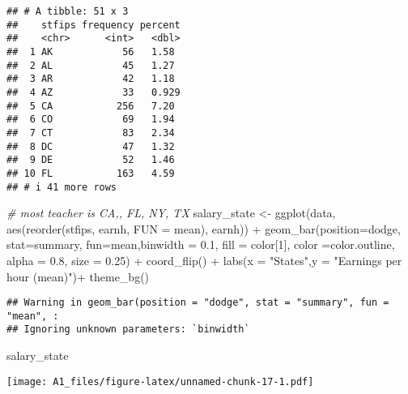 \documentclass[
]{article}
\newenvironment{Shaded}{\begin{snugshade}}{\end{snugshade}}
\newcommand{\AttributeTok}[1]{\textcolor[rgb]{0.77,0.63,0.00}{#1}}
\newcommand{\CommentTok}[1]{\textcolor[rgb]{0.56,0.35,0.01}{\textit{#1}}}
\newcommand{\DecValTok}[1]{\textcolor[rgb]{0.00,0.00,0.81}{#1}}
\newcommand{\FloatTok}[1]{\textcolor[rgb]{0.00,0.00,0.81}{#1}}
\newcommand{\FunctionTok}[1]{\textcolor[rgb]{0.00,0.00,0.00}{#1}}
\newcommand{\NormalTok}[1]{#1}
\newcommand{\OtherTok}[1]{\textcolor[rgb]{0.56,0.35,0.01}{#1}}
\newcommand{\SpecialCharTok}[1]{\textcolor[rgb]{0.00,0.00,0.00}{#1}}
\newcommand{\StringTok}[1]{\textcolor[rgb]{0.31,0.60,0.02}{#1}}
\begin{document}
\begin{verbatim}
## # A tibble: 51 x 3
##    stfips frequency percent
##    <chr>      <int>   <dbl>
##  1 AK            56   1.58 
##  2 AL            45   1.27 
##  3 AR            42   1.18 
##  4 AZ            33   0.929
##  5 CA           256   7.20 
##  6 CO            69   1.94 
##  7 CT            83   2.34 
##  8 DC            47   1.32 
##  9 DE            52   1.46 
## 10 FL           163   4.59 
## # i 41 more rows
\end{verbatim}

\begin{Shaded}
\begin{Highlighting}[]
\CommentTok{\# most teacher is CA,, FL, NY, TX}
\NormalTok{salary\_state }\OtherTok{\textless{}{-}} \FunctionTok{ggplot}\NormalTok{(data, }\FunctionTok{aes}\NormalTok{(}\FunctionTok{reorder}\NormalTok{(stfips, earnh, }\AttributeTok{FUN =}\NormalTok{ mean), earnh)) }\SpecialCharTok{+}
  \FunctionTok{geom\_bar}\NormalTok{(}\AttributeTok{position=}\StringTok{\textquotesingle{}dodge\textquotesingle{}}\NormalTok{, }\AttributeTok{stat=}\StringTok{\textquotesingle{}summary\textquotesingle{}}\NormalTok{, }\AttributeTok{fun=}\StringTok{\textquotesingle{}mean\textquotesingle{}}\NormalTok{,}\AttributeTok{binwidth =} \FloatTok{0.1}\NormalTok{, }\AttributeTok{fill =}\NormalTok{ color[}\DecValTok{1}\NormalTok{], }\AttributeTok{color =}\NormalTok{color.outline, }\AttributeTok{alpha =} \FloatTok{0.8}\NormalTok{, }\AttributeTok{size =} \FloatTok{0.25}\NormalTok{) }\SpecialCharTok{+}
   \FunctionTok{coord\_flip}\NormalTok{() }\SpecialCharTok{+}
  \FunctionTok{labs}\NormalTok{(}\AttributeTok{x =} \StringTok{"States"}\NormalTok{,}\AttributeTok{y =} \StringTok{"Earnings per hour (mean)"}\NormalTok{)}\SpecialCharTok{+}
  \FunctionTok{theme\_bg}\NormalTok{()}
\end{Highlighting}
\end{Shaded}

\begin{verbatim}
## Warning in geom_bar(position = "dodge", stat = "summary", fun = "mean", :
## Ignoring unknown parameters: `binwidth`
\end{verbatim}

\begin{Shaded}
\begin{Highlighting}[]
\NormalTok{salary\_state}
\end{Highlighting}
\end{Shaded}

\texttt{[image: A1\_files/figure-latex/unnamed-chunk-17-1.pdf]}
\end{document}
